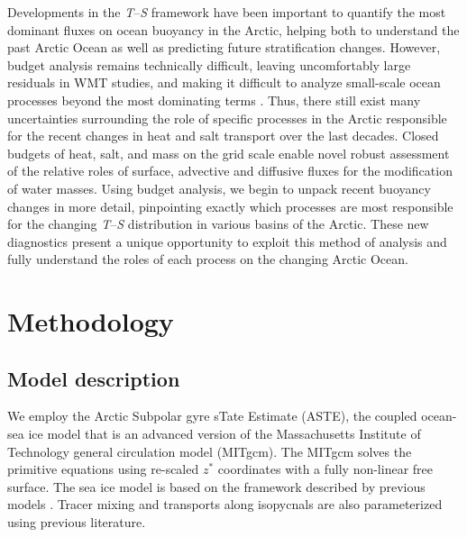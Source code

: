 \documentclass[a4paper,12pt]{article}
\begin{document}
    Developments in the \emph{T}--\emph{S} framework have been important to quantify the most dominant fluxes on ocean buoyancy in the Arctic, helping both to understand the past Arctic Ocean as well as predicting future stratification changes. However, budget analysis remains technically difficult, leaving uncomfortably large residuals in WMT studies, and making it difficult to analyze small-scale ocean processes beyond the most dominating terms \cite{Pemberton2015}. Thus, there still exist many uncertainties surrounding the role of specific processes in the Arctic responsible for the recent changes in heat and salt transport over the last decades. Closed budgets of heat, salt, and mass on the grid scale enable novel robust assessment of the relative roles of surface, advective and diffusive fluxes for the modification of water masses. Using budget analysis, we begin to unpack recent buoyancy changes in more detail, pinpointing exactly which processes are most responsible for the changing \emph{T}--\emph{S} distribution in various basins of the Arctic. These new diagnostics present a unique opportunity to exploit this method of analysis and fully understand the roles of each process on the changing Arctic Ocean.
    

    \section{Methodology}

    \subsection{Model description}\label{ASTE}
    We employ the Arctic Subpolar gyre sTate Estimate (ASTE), the coupled ocean-sea ice model that is an advanced version of the Massachusetts Institute of Technology general circulation model (MITgcm). The MITgcm solves the primitive equations using re-scaled $z^*$ coordinates with a fully non-linear free surface. The sea ice model is based on the framework described by previous models \cite{Menemenlis2005,Losch2010,Heimbach2010}. Tracer mixing and transports along isopycnals are also parameterized using previous literature.
\end{document}
